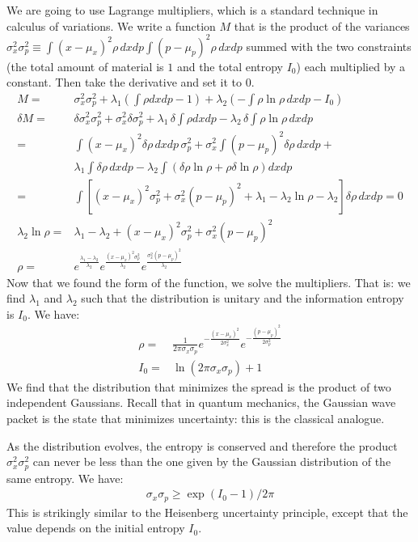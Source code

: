 \documentclass[aps,pra,10pt,floatfix,nofootinbib]{revtex4-1}
\theoremstyle{definition}
\begin{document}
We are going to use Lagrange multipliers, which is a standard technique in calculus of variations. We write a function $M$ that is the product of the variances $\sigma_x^2 \sigma_p^2 \equiv \int (x-\mu_x)^2 \rho \, dxdp \int (p-\mu_p)^2 \rho \, dxdp$ summed with the two constraints (the total amount of material is $1$ and the total entropy $I_0$) each multiplied by a constant. Then take the derivative and set it to $0$.
\begin{align*}
M = &\sigma_x^2 \sigma_p^2 + \lambda_1\left(\int \rho dxdp - 1\right) + \lambda_2\left(- \int \rho \ln \rho \, dxdp - I_0\right)\\
\delta M = & \delta \sigma_x^2 \sigma_p^2 + \sigma_x^2 \delta \sigma_p^2 +  \lambda_1 \, \delta \int \rho dxdp - \lambda_2 \, \delta \int \rho \ln \rho \, dxdp \\
= &\int  (x-\mu_x)^2 \delta \rho \, dxdp \, \sigma_p^2 +  \sigma_x^2 \int (p-\mu_p)^2 \delta \rho \, dxdp + \\ &\lambda_1 \int \delta\rho \, dxdp - \lambda_2 \int (\delta \rho \ln \rho + \rho \delta \ln \rho)dxdp  \\
= &\int [(x-\mu_x)^2 \sigma_p^2 + \sigma_x^2 (p-\mu_p)^2 + \lambda_1 - \lambda_2 \ln \rho - \lambda_2 ] \delta \rho  \, dxdp = 0 \\
\lambda_2 \ln \rho = &\lambda_1 - \lambda_2 + (x-\mu_x)^2 \sigma_p^2 + \sigma_x^2 (p-\mu_p)^2 \\
\rho = &e^{\frac{\lambda_1 - \lambda_2}{\lambda_2}}e^{\frac{(x-\mu_x)^2 \sigma_p^2}{\lambda_2}}e^{\frac{\sigma_x^2 (p-\mu_p)^2}{\lambda_2}}
\end{align*}
Now that we found the form of the function, we solve the multipliers. That is: we find $\lambda_1$ and $\lambda_2$ such that the distribution is unitary and the information entropy is $I_0$. We have:
\begin{align*}
\rho = &\frac{1}{ 2 \pi \sigma_x \sigma_p} e^{-\frac{(x-\mu_x)^2}{2\sigma_x^2}} e^{-\frac{(p-\mu_p)^2}{2\sigma_p^2}} \\
I_0 = &\ln (2\pi\sigma_x\sigma_p) + 1
\end{align*}
We find that the distribution that minimizes the spread is the product of two independent Gaussians. Recall that in quantum mechanics, the Gaussian wave packet is the state that minimizes uncertainty: this is the classical analogue.

As the distribution evolves, the entropy is conserved and therefore the product $\sigma_x^2 \sigma_p^2$ can never be less than the one given by the Gaussian distribution of the same entropy. We have:
\begin{align*}
\sigma_x\sigma_p \geq \exp (I_0 - 1) / 2 \pi 
\end{align*}
This is strikingly similar to the Heisenberg uncertainty principle, except that the value depends on the initial entropy $I_0$.
\end{document}
